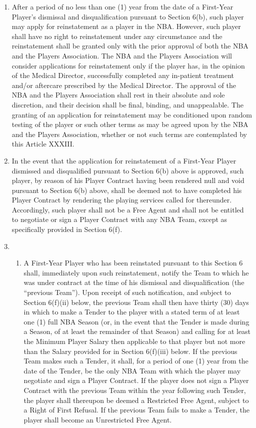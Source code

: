 \documentclass[
]{book}
\providecommand{\tightlist}{%
  \setlength{\itemsep}{0pt}\setlength{\parskip}{0pt}}
\begin{document}
\begin{enumerate}
\item
  After a period of no less than one (1) year from the date of a First-Year Player's dismissal and disqualification pursuant to Section 6(b), such player may apply for reinstatement as a player in the NBA. However, such player shall have no right to reinstatement under any circumstance and the reinstatement shall be granted only with the prior approval of both the NBA and the Players Association. The NBA and the Players Association will consider applications for reinstatement only if the player has, in the opinion of the Medical Director, successfully completed any in-patient treatment and/or aftercare prescribed by the Medical Director. The approval of the NBA and the Players Association shall rest in their absolute and sole discretion, and their decision shall be final, binding, and unappealable. The granting of an application for reinstatement may be conditioned upon random testing of the player or such other terms as may be agreed upon by the NBA and the Players Association, whether or not such terms are contemplated by this Article XXXIII.
\item
  In the event that the application for reinstatement of a First-Year Player dismissed and disqualified pursuant to Section 6(b) above is approved, such player, by reason of his Player Contract having been rendered null and void pursuant to Section 6(b) above, shall be deemed not to have completed his Player Contract by rendering the playing services called for thereunder. Accordingly, such player shall not be a Free Agent and shall not be entitled to negotiate or sign a Player Contract with any NBA Team, except as specifically provided in Section 6(f).
\item
  \begin{enumerate}
  \def\labelenumii{(\roman{enumii})}
  \tightlist
  \item
    A First-Year Player who has been reinstated pursuant to this Section 6 shall, immediately upon such reinstatement, notify the Team to which he was under contract at the time of his dismissal and disqualification (the ``previous Team''). Upon receipt of such notification, and subject to Section 6(f)(ii) below, the previous Team shall then have thirty (30) days in which to make a Tender to the player with a stated term of at least one (1) full NBA Season (or, in the event that the Tender is made during a Season, of at least the remainder of that Season) and calling for at least the Minimum Player Salary then applicable to that player but not more than the Salary provided for in Section 6(f)(iii) below. If the previous Team makes such a Tender, it shall, for a period of one (1) year from the date of the Tender, be the only NBA Team with which the player may negotiate and sign a Player Contract. If the player does not sign a Player Contract with the previous Team within the year following such Tender, the player shall thereupon be deemed a Restricted Free Agent, subject to a Right of First Refusal. If the previous Team fails to make a Tender, the player shall become an Unrestricted Free Agent.

\end{enumerate}
\end{enumerate}
\end{document}
